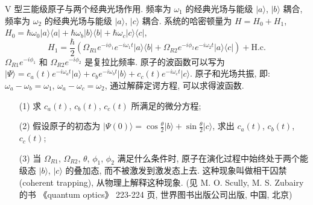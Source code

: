 \documentclass{assignment}
\begin{document}
\begin{prob}
    V 型三能级原子与两个经典光场作用. 频率为 $\omega_1$ 的经典光场与能级 $\lvert a\rangle$, $\lvert b\rangle$ 耦合, 频率为 $\omega_2$ 的经典光场与能级 $\lvert a\rangle$, $\lvert c\rangle$ 耦合. 系统的哈密顿量为 $H=H_0+H_1$, $H_0=\hbar\omega_0\lvert a\rangle\langle a\rvert+\hbar\omega_b\lvert b\rangle\langle b\rvert+\hbar\omega_c\lvert c\rangle\langle c\rvert$,
    \[
        H_1=\frac{\hbar}{2}(\Omega_{R1}e^{-i\phi_1}e^{-i\omega_1t}\lvert a\rangle\langle b\rvert+\Omega_{R2}e^{-i\phi_2}e^{-i\omega_2t}\lvert a\rangle\langle c\rvert)+\text{H.c.}
    \]
    $\Omega_{R1}e^{-i\phi_1}$ 和 $\Omega_{R2}e^{-i\phi_2}$ 是复拉比频率. 原子的波函数可以写为 $\lvert\Psi\rangle=c_a(t)e^{-i\omega_at}\lvert a\rangle+c_be^{-i\omega_bt}\lvert b\rangle+c_c(t)e^{-i\omega_ct}\lvert c\rangle$. 原子和光场共振, 即: $\omega_a-\omega_b=\omega_1$, $\omega_a-\omega_c=\omega_2$, 通过解薛定谔方程, 可以求得波函数.
    \begin{itemize}
        \item[(1)] 求 $c_a(t)$, $c_b(t)$, $c_c(t)$ 所满足的微分方程;
        \item[(2)] 假设原子的初态为 $\lvert\Psi(0)\rangle=\cos\frac{\theta}{2}\lvert b\rangle+\sin\frac{\theta}{2}\lvert c\rangle$, 求出 $c_a(t)$, $c_b(t)$, $c_c(t)$;
        \item[(3)] 当 $\Omega_{R1}$, $\Omega_{R2}$, $\theta$, $\phi_1$, $\phi_2$ 满足什么条件时, 原子在演化过程中始终处于两个能级态 $\lvert b\rangle$, $\lvert c\rangle$ 的叠加态, 而不被激发到激发态上去. 这种现象叫做相干囚禁 (coherent trapping), 从物理上解释这种现象. (见 M. O. Scully, M. S. Zubairy 的书 《quantum optics》 223-224 页, 世界图书出版公司出版, 中国, 北京)
    \end{itemize}
\end{prob}
\begin{sol}
    
\end{sol}
\end{document}

